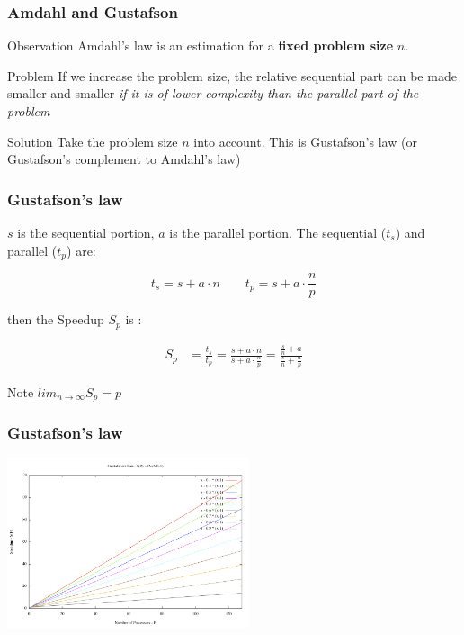 \begin{frame}
\frametitle{Amdahl and Gustafson}
\begin{exampleblock}{Observation}
Amdahl's law is an estimation for a \textbf{fixed problem size} $n$.
\end{exampleblock}
\begin{alertblock}{Problem}
If we increase the problem size, the relative sequential part can be made smaller and smaller \textit{if it is of lower complexity than the parallel part of the problem}
\end{alertblock}
\begin{alertblock}{Solution}
Take the problem size $n$ into account. This is Gustafson's law (or Gustafson's complement to Amdahl's law)
\end{alertblock}
\end{frame}


\begin{frame}[containsverbatim]
\frametitle{Gustafson's law}
$s$ is the sequential portion, $a$ is the parallel portion. The sequential ($t_s$) and parallel ($t_p$) are:

\[
t_s = s + a \cdot n \qquad t_p = s + a \cdot \frac{n}{p}
\]

then the Speedup $S_p$ is :

\begin{align} 
S_p &= \frac{t_s}{t_p} = \frac{s + a \cdot n}{s + a \cdot \frac{n}{p}} = \frac{\frac{s}{n} + a}{\frac{s}{n} + \frac{a}{p}}
\end{align}

Note $lim_{n \rightarrow \infty} S_p = p$

\end{frame}




\begin{frame}[containsverbatim]
\frametitle{Gustafson's law}
\begin{center}
        {\includegraphics[height=5cm]{Day0/images/gustafson.png}}
\end{center}
\end{frame}

